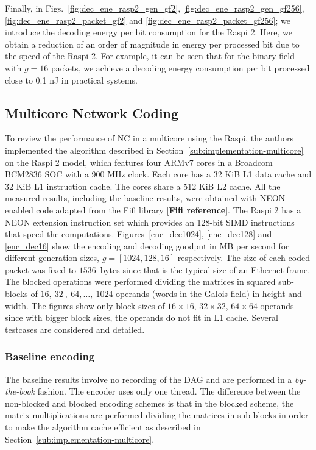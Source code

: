 %
Finally, in Figs.~\ref{fig:dec_ene_rasp2_gen_gf2},
\ref{fig:dec_ene_rasp2_gen_gf256}, \ref{fig:dec_ene_rasp2_packet_gf2}
and \ref{fig:dec_ene_rasp2_packet_gf256}; we introduce the decoding energy
per bit consumption for the \ac{Raspi} 2. Here, we obtain a reduction
of an order of magnitude in energy per processed bit due to the speed
of the \ac{Raspi} 2. For example, it can be seen that for the binary field
with $g = 16$ packets, we achieve a decoding energy consumption per bit 
processed close to 0.1 nJ in practical systems.
%
\subsection{Multicore Network Coding}
\label{subs:multicore-network-coding}

To review the performance of \ac{NC} in a multicore using the \ac{Raspi},
the authors implemented the algorithm described in
Section~\ref{sub:implementation-multicore} on the \ac{Raspi} 2 model,
which features four ARMv7 cores in a Broadcom BCM2836 \ac{SOC}
with a 900 MHz clock. Each core has a 32 KiB L1 data cache and 32 KiB
L1 instruction cache. The cores share a 512 KiB L2 cache. All the
measured results, including the baseline results, were obtained with
NEON-enabled code adapted from the Fifi library [\textbf{Fifi reference}].
The \ac{Raspi} 2 has a NEON extension instruction set which provides
an 128-bit \ac{SIMD} instructions that speed the computations.
Figures~\ref{enc_dec1024}, \ref{enc_dec128} and
\ref{enc_dec16} show the encoding and decoding goodput in MB per
second for different generation sizes, $g = [1024, 128, 16]$
respectively. The size of each coded packet was fixed to $1536$~bytes
since that is the typical size of an Ethernet frame. The blocked operations
were performed dividing the matrices in squared sub-blocks of
$16,\ 32\ ,\ 64,\ldots,\ 1024$ operands (words in the Galois field) in
height and width. The figures show only block sizes of
$16 \times 16$, $32 \times 32$, $64 \times 64$ operands since with bigger
block sizes, the operands do not fit in L1 cache. Several testcases
are considered and detailed.

\subsubsection{Baseline encoding}
The baseline results involve no recording of the
\ac{DAG} and are performed in a \emph{by-the-book} fashion. The encoder uses
only one thread. The difference between the non-blocked and blocked
encoding schemes is that in the blocked scheme, the matrix multiplications are
performed dividing the matrices in sub-blocks in order to make the algorithm
cache efficient as described in Section~\ref{sub:implementation-multicore}.

